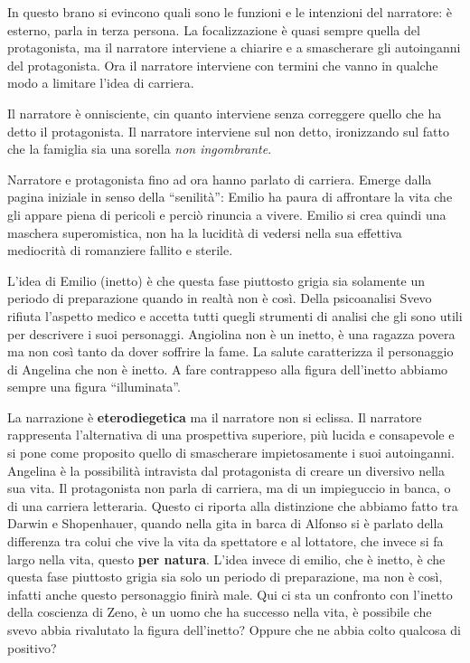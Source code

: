 \documentclass[a4paper, twoside, titlepage]{book}
\begin{document}
In questo brano si evincono quali sono le funzioni e le intenzioni del narratore: è esterno, parla in terza persona. La focalizzazione è quasi sempre quella del protagonista, ma il narratore interviene a chiarire e a smascherare gli autoinganni del protagonista. Ora il narratore interviene con termini che vanno in qualche modo a limitare l'idea di carriera.

Il narratore è onnisciente, cin quanto interviene senza correggere quello che ha detto il protagonista. Il narratore interviene sul non detto, ironizzando sul fatto che la famiglia sia una sorella \textit{non ingombrante}.

Narratore e protagonista fino ad ora hanno parlato di carriera.
Emerge dalla pagina iniziale in senso della “senilità”: Emilio ha paura di affrontare la vita che gli appare piena di pericoli e perciò rinuncia a vivere. Emilio si crea quindi una maschera superomistica, non ha la lucidità di vedersi nella sua effettiva mediocrità di romanziere fallito e sterile.

L’idea di Emilio (inetto) è che questa fase piuttosto grigia sia solamente un periodo di preparazione quando in realtà non è così.
Della psicoanalisi Svevo rifiuta l’aspetto medico e accetta tutti quegli strumenti di analisi che gli sono utili per descrivere i suoi personaggi. Angiolina non è un inetto, è una ragazza povera ma non così tanto da dover soffrire la fame. La salute caratterizza il personaggio di Angelina che non è inetto. A fare contrappeso alla figura dell’inetto abbiamo sempre una figura “illuminata”.

La narrazione è \textbf{eterodiegetica} ma il narratore non si eclissa. Il narratore rappresenta l’alternativa di una prospettiva superiore, più lucida e consapevole e si pone come proposito quello di smascherare impietosamente i suoi autoinganni.
Angelina è la possibilità intravista dal protagonista di creare un diversivo nella sua vita. Il protagonista non parla di carriera, ma di un impieguccio in banca, o di una carriera letteraria.
Questo ci riporta alla distinzione che abbiamo fatto tra Darwin e Shopenhauer, quando nella gita in barca di Alfonso si è parlato della differenza tra colui che vive la vita da spettatore e al lottatore, che invece si fa largo nella vita, questo \textbf{per natura}.
L’idea invece di emilio, che è inetto, è che questa fase piuttosto grigia sia solo un periodo di preparazione, ma non è così, infatti anche questo personaggio finirà male.
Qui ci sta un  confronto con l’inetto della coscienza di Zeno, è un uomo che ha successo nella vita, è possibile che svevo abbia rivalutato la figura dell’inetto?  Oppure che ne abbia colto qualcosa di positivo?
\end{document}
